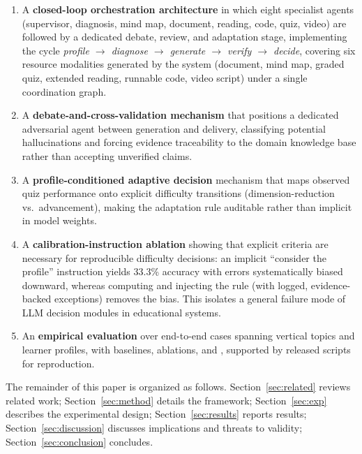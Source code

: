 \begin{enumerate}
\item[C1.] A \textbf{closed-loop orchestration architecture} in which eight
specialist agents (supervisor, diagnosis, mind map, document, reading, code,
quiz, video) are followed by a dedicated debate, review, and adaptation stage,
implementing the cycle
\emph{profile $\rightarrow$ diagnose $\rightarrow$ generate $\rightarrow$
verify $\rightarrow$ decide}, covering six resource modalities generated by
the system (document, mind map, graded quiz, extended reading, runnable code,
video script) under a single coordination graph.
\item[C2.] A \textbf{debate-and-cross-validation mechanism} that positions a
dedicated adversarial agent between generation and delivery, classifying
potential hallucinations and forcing evidence traceability to the domain
knowledge base rather than accepting unverified claims.
\item[C3.] A \textbf{profile-conditioned adaptive decision} mechanism that maps
observed quiz performance onto explicit difficulty transitions
(dimension-reduction vs.\ advancement), making the adaptation rule auditable
rather than implicit in model weights.
\item[C4.] A \textbf{calibration-instruction ablation} showing that explicit
criteria are necessary for reproducible difficulty decisions: an implicit
``consider the profile'' instruction yields 33.3\% accuracy with errors
systematically biased downward, whereas computing and injecting the rule (with
logged, evidence-backed exceptions) removes the bias. This isolates a general
failure mode of LLM decision modules in educational systems.
\item[C5.] An \textbf{empirical evaluation} over  end-to-end cases
spanning  vertical topics and  learner profiles, with
baselines, ablations, and ,
supported by released scripts for reproduction.
\end{enumerate}

The remainder of this paper is organized as follows. Section~\ref{sec:related}
reviews related work; Section~\ref{sec:method} details the framework;
Section~\ref{sec:exp} describes the experimental design;
Section~\ref{sec:results} reports results; Section~\ref{sec:discussion}
discusses implications and threats to validity; Section~\ref{sec:conclusion}
concludes.
